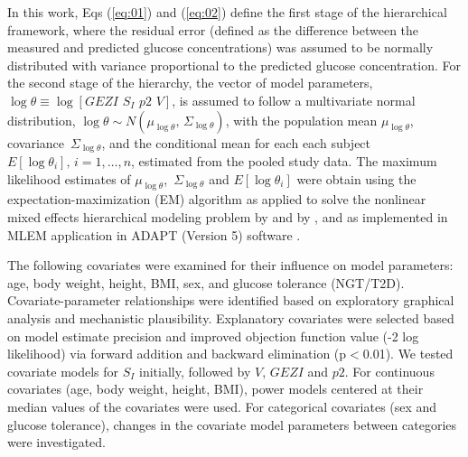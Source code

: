 \documentclass[utf8]{frontiersSCNS} %
\begin{document}
In this work, Eqs (\ref{eq:01}) and (\ref{eq:02}) define the first stage of the hierarchical framework, where the residual error (defined as the difference between the measured and predicted glucose concentrations) was assumed to be normally distributed with variance proportional to the predicted glucose concentration. For the second stage of the hierarchy, the vector of model parameters, $\log \theta  \equiv \log \left[ {GEZI\,\,{S_I}\,\,p2\,\,V} \right]$, is assumed to follow a multivariate normal distribution, $\log \theta  \sim N\left( {{\mu_{\log \theta }},\,{\Sigma _{\log \theta }}} \right)$, with the population mean   ${\mu _{\log \theta }}$, covariance $\,{\Sigma _{\log \theta }}$, and the conditional mean for each each subject $E\left[ {\log {\theta _i}} \right],\,i = 1, \ldots ,n$, estimated from the pooled study data. The maximum likelihood estimates of   ${\mu _{\log \theta }}$, $\,{\Sigma _{\log \theta }}$ and $E\left[ {\log {\theta _i}} \right]$ were obtain using the expectation-maximization (EM) algorithm as applied to solve the nonlinear mixed effects hierarchical modeling problem by \citet{Schumitzky1995EMAnalysis} and  by \citet{walker_1996}, and as implemented in  MLEM application in ADAPT (Version 5) software \citep{AdaptUserGuide}. 

The following covariates were examined for their influence on  model parameters: age, body weight, height, BMI, sex, and glucose tolerance (NGT/T2D). Covariate-parameter relationships were identified based on exploratory graphical analysis and mechanistic plausibility. Explanatory covariates were selected based on model estimate precision and improved objection function value (-2 log likelihood) via forward addition and backward elimination (p$<$0.01). We tested covariate models for $S_I$ initially, followed by $V$, $GEZI$ and $p2$. For continuous covariates (age, body weight, height, BMI), power models centered at their median values of the covariates were used. For categorical covariates (sex and glucose tolerance), changes in the covariate model parameters between categories were investigated. 

\vskip 0.5cm
\end{document}
